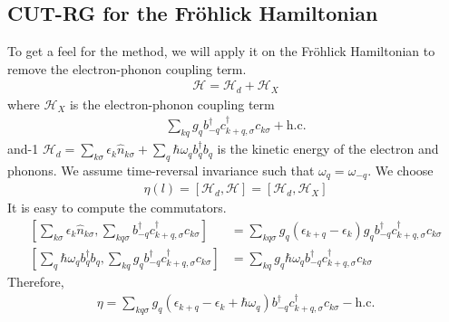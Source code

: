 \subsection{CUT-RG for the Fröhlick Hamiltonian}
To get a feel for the method, we will apply it on the Fröhlick Hamiltonian to remove the electron-phonon coupling term. 
\begin{equation}\begin{aligned}
\mathcal{H} = \mathcal{H}_d + \mathcal{H}_X
\end{aligned}\end{equation}
where \(\mathcal{H}_X\) is the electron-phonon coupling term
\begin{equation}\begin{aligned}
\sum_{kq}g_{q}b^\dagger_{-q}c^\dagger_{k+q,\sigma}c_{k\sigma} + \text{h.c.}
\end{aligned}\end{equation}
and-1 \(\mathcal{H}_d = \sum_{k\sigma}\epsilon_k \hat n_{k\sigma} + \sum_q \hbar\omega_q b^\dagger_q b_q\) is the kinetic energy of the electron and phonons. We assume time-reversal invariance such that \(\omega_q = \omega_{-q}\). We choose
\begin{equation}\begin{aligned}
	\eta(l) = \left[\mathcal{H}_d,\mathcal{H}\right] = \left[\mathcal{H}_d,\mathcal{H}_X\right]
\end{aligned}\end{equation}
It is easy to compute the commutators.
\begin{equation}\begin{aligned}
	\left[\sum_{k\sigma}\epsilon_k \hat n_{k\sigma},\sum_{kq\sigma}b^\dagger_{-q}c^\dagger_{k+q,\sigma}c_{k\sigma}\right]  &= \sum_{kq\sigma}g_q\left(\epsilon_{k+q} - \epsilon_k\right)g_qb^\dagger_{-q}c^\dagger_{k+q,\sigma}c_{k\sigma}\\
	\left[\sum_{q}\hbar \omega_q b^\dagger_q b_q,\sum_{kq}g_{q}b^\dagger_{-q}c^\dagger_{k+q,\sigma}c_{k\sigma}\right]  &= \sum_{kq}g_q \hbar \omega_q b^\dagger_{-q}c^\dagger_{k+q,\sigma}c_{k\sigma}
\end{aligned}\end{equation}
Therefore,
\begin{equation}\begin{aligned}
	\eta =\sum_{kq\sigma}g_q\left(\epsilon_{k+q} - \epsilon_k + \hbar\omega_q\right)b^\dagger_{-q}c^\dagger_{k+q,\sigma}c_{k\sigma} - \text{h.c.}
\end{aligned}\end{equation}

